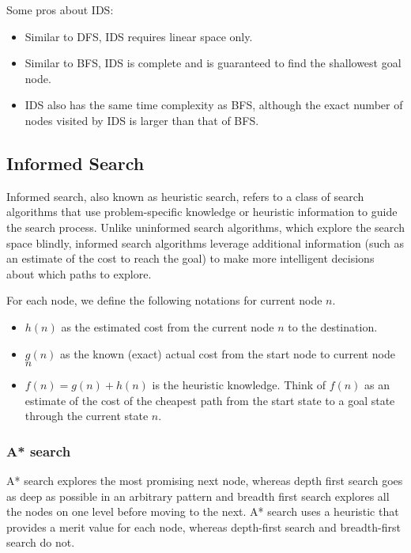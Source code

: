                 Some pros about IDS:

                \begin{itemize}
                    \item Similar to DFS, IDS requires linear space only.
                    \item Similar to BFS, IDS is complete and is guaranteed to find the shallowest goal node.
                    \item IDS also has the same time complexity as BFS, although the exact number of nodes visited by IDS is larger than that of BFS.
                \end{itemize}

        \subsection{Informed Search}
            Informed search, also known as heuristic search, refers to a class of search algorithms that use problem-specific knowledge or heuristic information to guide the search process. Unlike uninformed search algorithms, which explore the search space blindly, informed search algorithms leverage additional information (such as an estimate of the cost to reach the goal) to make more intelligent decisions about which paths to explore.

            For each node, we define the following notations for current node $n$.

            \begin{itemize}
                \item $h(n)$ as the estimated cost from the current node $n$ to the destination.
                \item $g(n)$ as the known (exact) actual cost from the start node to current node $n$
                \item $f(n) = g(n) + h(n)$ is the heuristic knowledge. Think of $f(n)$ as an estimate of the cost of the cheapest path from the start state to a goal state through the current state $n$.
            \end{itemize}

            \subsubsection{A* search}
                A* search explores the most promising next node, whereas depth first search goes as deep as possible in an arbitrary pattern and breadth first search explores all the nodes on one level before moving to the next. A* search uses a heuristic that provides a merit value for each node, whereas depth-first search and breadth-first search do not.

